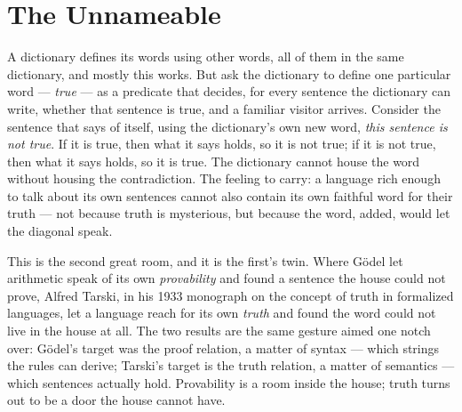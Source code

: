 \chapter{The Unnameable}

\begin{intuition}
A dictionary defines its words using other words, all of them in the same
dictionary, and mostly this works. But ask the dictionary to define one
particular word --- \emph{true} --- as a predicate that decides, for every
sentence the dictionary can write, whether that sentence is true, and a
familiar visitor arrives. Consider the sentence that says of itself, using
the dictionary's own new word, \emph{this sentence is not true}. If it is
true, then what it says holds, so it is not true; if it is not true, then
what it says holds, so it is true. The dictionary cannot house the word
without housing the contradiction. The feeling to carry: a language rich
enough to talk about its own sentences cannot also contain its own
faithful word for their truth --- not because truth is mysterious, but
because the word, added, would let the diagonal speak.
\end{intuition}

This is the second great room, and it is the first's twin. Where G\"odel
let arithmetic speak of its own \emph{provability} and found a sentence
the house could not prove, Alfred Tarski, in his 1933 monograph on the
concept of truth in formalized languages, let a language reach for its own
\emph{truth} and found the word could not live in the house at all. The
two results are the same gesture aimed one notch over: G\"odel's target
was the proof relation, a matter of syntax --- which strings the rules can
derive; Tarski's target is the truth relation, a matter of semantics ---
which sentences actually hold. Provability is a room inside the house;
truth turns out to be a door the house cannot have.

